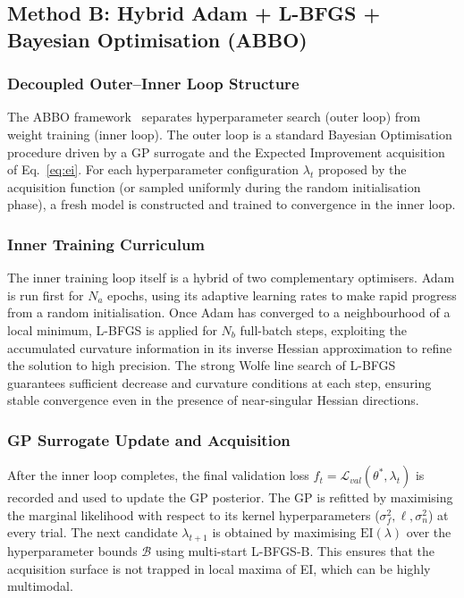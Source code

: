 \documentclass[11pt]{article}
\begin{document}
\subsection{Method B: Hybrid Adam + L-BFGS + Bayesian Optimisation (ABBO)}

\subsubsection{Decoupled Outer--Inner Loop Structure}

The ABBO framework~\cite{snoek2012,liu1989lbfgs,kingma2015adam}
separates hyperparameter search (outer loop) from weight training
(inner loop).  The outer loop is a standard Bayesian Optimisation
procedure driven by a GP surrogate and the Expected Improvement
acquisition of Eq.~\eqref{eq:ei}.  For each hyperparameter
configuration $\lambda_t$ proposed by the acquisition function (or
sampled uniformly during the random initialisation phase), a fresh
model is constructed and trained to convergence in the inner loop.

\subsubsection{Inner Training Curriculum}

The inner training loop itself is a hybrid of two complementary
optimisers.  Adam is run first for $N_a$ epochs, using its adaptive
learning rates to make rapid progress from a random initialisation.
Once Adam has converged to a neighbourhood of a local minimum, L-BFGS
is applied for $N_b$ full-batch steps, exploiting the accumulated
curvature information in its inverse Hessian approximation to refine
the solution to high precision.  The strong Wolfe line search of
L-BFGS~\cite{wolfe1969} guarantees sufficient decrease and curvature
conditions at each step, ensuring stable convergence even in the
presence of near-singular Hessian directions.

\subsubsection{GP Surrogate Update and Acquisition}

After the inner loop completes, the final validation loss
$f_t = \mathcal{L}_{val}(\theta^*, \lambda_t)$ is recorded and used
to update the GP posterior.  The GP is refitted by maximising the
marginal likelihood with respect to its kernel hyperparameters
($\sigma_f^2, \ell, \sigma_n^2$) at every trial.  The next candidate
$\lambda_{t+1}$ is obtained by maximising $\mathrm{EI}(\lambda)$ over
the hyperparameter bounds $\mathcal{B}$ using multi-start L-BFGS-B.
This ensures that the acquisition surface is not trapped in local
maxima of EI, which can be highly multimodal.
\end{document}
